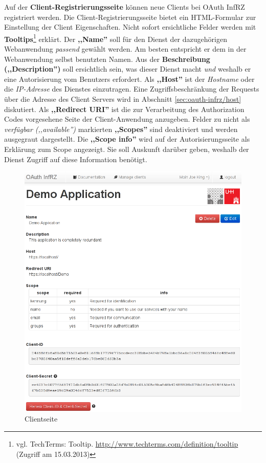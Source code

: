 \documentclass[12pt,a4paper,pointednumbers,abstracton]{scrartcl}
\begin{document}
Auf der \textbf{Client-Registrierungsseite} können neue Clients bei OAuth InfRZ registriert werden.
Die Client-Registrierungsseite bietet ein HTML-Formular zur Einstellung der Client Eigenschaften.
Nicht sofort ersichtliche Felder werden mit \textbf{Tooltips}\footnote{vgl. TechTerms: Tooltip. \url{http://www.techterms.com/definition/tooltip} (Zugriff am 15.03.2013)} erklärt.
Der \textbf{,,Name''} soll für den Dienst der dazugehörigen Webanwendung \emph{passend} gewählt werden.
Am besten entspricht er dem in der Webanwendung selbst benutzten Namen.
Aus der \textbf{Beschreibung (,,Description'')} soll ersichtlich sein, was dieser Dienst macht \emph{und} weshalb er eine Autorisierung vom Benutzers erfordert.
Als \textbf{,,Host''} ist der \emph{Hostname} oder die \emph{IP-Adresse} des Dienstes einzutragen.
Eine Zugriffsbeschränkung der Requests über die Adresse des Client Servers wird in Abschnitt \ref{sec:oauth-infrz/host} diskutiert.
Als \textbf{,,Redirect URI''} ist die zur Verarbeitung des Authorization Codes vorgesehene Seite der Client-Anwendung anzugeben.
Felder zu nicht als \emph{verfügbar (,,available'')} markierten \textbf{,,Scopes''} sind deaktiviert und werden ausgegraut dargestellt.
Die \textbf{,,Scope info''} wird auf der Autorisierungsseite als Erklärung zum Scope angezeigt.
Sie soll Auskunft darüber geben, weshalb der Dienst Zugriff auf diese Information benötigt.

\begin{figure}[h!]
\centering
\includegraphics[width=15cm]{img/oauth_infrz/client}
\caption{Clientseite}
\label{pic:oauth_infrz/client}
\end{figure}
\end{document}
